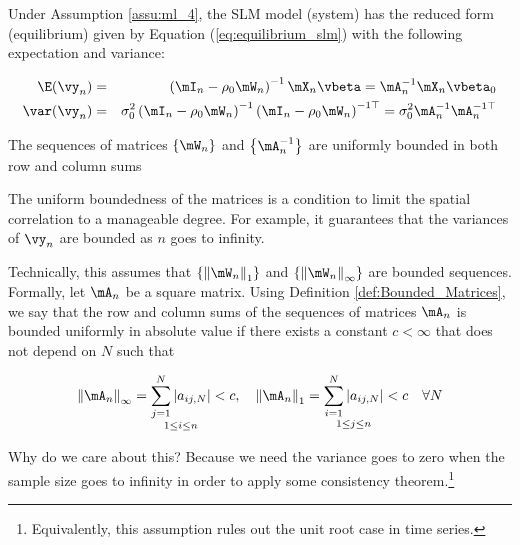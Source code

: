 \documentclass[english,12pt]{book}\usepackage[]{graphicx}\usepackage[]{xcolor}
\begin{document}
Under Assumption \ref{assu:ml_4}, the SLM model (system) has the reduced form (equilibrium) given by Equation (\ref{eq:equilibrium_slm}) with the following expectation and variance:

\begin{eqnarray}
\E(\vy_n)   &=& \left(\mI_n - \rho_0\mW_n\right)^{-1}\mX_n\vbeta  = \mA_n^{-1}\mX_n\vbeta_0\\
\var(\vy_n) &=& \sigma^2_{0}\left(\mI_n - \rho_0\mW_n\right)^{-1}\left(\mI_n - \rho_0\mW_n\right)^{-1\top} = \sigma^2_0\mA_n^{-1}\mA_n^{-1\top}
\end{eqnarray}


\begin{assumption}\label{assu:ml_5}
	The sequences of matrices $\left\lbrace \mW_n \right\rbrace$ and $\left\lbrace \mA_n^{-1} \right\rbrace$ are uniformly bounded in both row and column sums 
\end{assumption}

The uniform boundedness of the matrices is a condition to limit the spatial correlation to a manageable degree. For example, it guarantees that the variances of $\vy_n$ are bounded as $n$ goes to infinity.

Technically, this assumes that $\left\lbrace \left\|\mW_n\right\|_1\right\rbrace$ and $\left\lbrace \left\|\mW_n\right\|_{\infty}\right\rbrace$ are bounded sequences. Formally, let $\mA_n$ be a square matrix. Using Definition \ref{def:Bounded_Matrices}, we say that the row and column sums of the sequences of matrices $\mA_n$ is bounded uniformly in absolute value if there exists a constant $c < \infty$ that does not depend on $N$ such that


\begin{equation*}
   \left\|\mA_n\right\|_{\infty} = \underset{1\leq i \leq n}{\sum_{j = 1} ^ N \left|a_{ij, N}\right|} < c, \quad  \left\|\mA_n\right\|_{1} = \underset{1\leq j \leq n}{\sum_{i = 1} ^ N \left|a_{ij, N}\right|} < c \quad \forall N
\end{equation*}

Why do we care about this? Because we need the variance goes to zero when the sample size goes to infinity in order to apply some consistency theorem.\footnote{Equivalently, this assumption rules out the unit root case in time series.}
\end{document}
